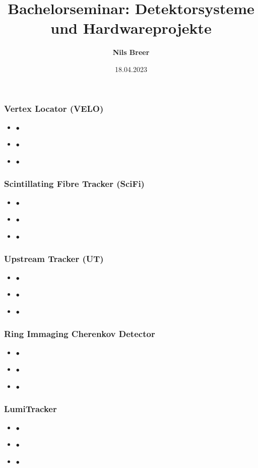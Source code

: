 \documentclass[aspectratio=1610, 12pt, xcolor=dvipsnames]{beamer}
\title{Bachelorseminar: Detektorsysteme und Hardwareprojekte}
\author[N.Breer]{\textbf{Nils Breer}}
\institute{TU Dortmund}
\date{18.04.2023}
\begin{document}
\maketitle

\begin{frame}\frametitle{Vertex Locator (VELO)}
  \begin{itemize}
    \item $\bullet$\,
    \item $\bullet$\,
    \item $\bullet$\,
  \end{itemize}
\end{frame}

\begin{frame}\frametitle{Scintillating Fibre Tracker (SciFi)}
  \begin{itemize}
    \item $\bullet$\,
    \item $\bullet$\,
    \item $\bullet$\,
  \end{itemize}
\end{frame}

\begin{frame}\frametitle{Upstream Tracker (UT)}
  \begin{itemize}
    \item $\bullet$\,
    \item $\bullet$\,
    \item $\bullet$\,
  \end{itemize}
\end{frame}

\begin{frame}\frametitle{Ring Immaging Cherenkov Detector}
  \begin{itemize}
    \item $\bullet$\,
    \item $\bullet$\,
    \item $\bullet$\,
  \end{itemize}
\end{frame}

\begin{frame}\frametitle{LumiTracker}
  \begin{itemize}
    \item $\bullet$\,
    \item $\bullet$\,
    \item $\bullet$\,
  \end{itemize}
\end{frame}
\end{document}

